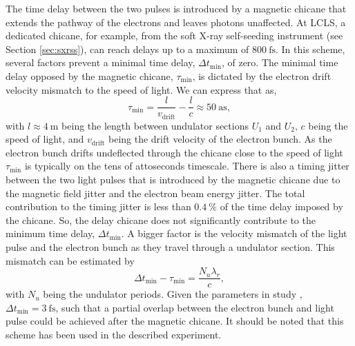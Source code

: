 %
The time delay between the two pulses is introduced by a magnetic chicane that extends the pathway of the electrons and leaves photons unaffected. At LCLS, a dedicated chicane, for example, from the soft X-ray self-seeding instrument (see Section \ref{sec:sxrss}), can reach delays up to a maximum of $\SI{800}{\femto\second}$.
In this scheme, several factors prevent a minimal time delay, $\Delta t_{\text{min}}$, of zero. The minimal time delay opposed by the magnetic chicane, $\tau_{\text{min}}$, is dictated by the electron drift velocity mismatch to the speed of light. We can express that as,
\begin{equation}
\tau_{\text{min}} = \frac{l}{v_{\text{drift}}} - \frac{l}{c}\approx \SI{50}{\atto\second},
\label{eq:alberto-delta-t-min}
\end{equation}
with $l\approx \SI{4}{\meter}$ being the length between undulator sections $U_{1}$ and $U_{2}$, $c$ being the speed of light, and $v_{\text{drift}}$ being the drift velocity of the electron bunch. As the electron bunch drifts undeflected through the chicane close to the speed of light $\tau_{\text{min}}$ is typically on the tens of attoseconds timescale.
There is also a timing jitter between the two light pulses that is introduced by the magnetic chicane due to the magnetic field jitter and the electron beam energy jitter. The total contribution to the timing jitter is less than $\SI{0.4}{\percent}$ of the time delay imposed by the chicane. So, the delay chicane does not significantly contribute to the minimum time delay, $\Delta t_{\text{min}}$. A bigger factor is the velocity mismatch of the light pulse and the electron bunch as they travel through a undulator section. This mismatch can be estimated by
\begin{equation}
\Delta t_{\text{min}}-\tau_{\text{min}}=\frac{N_{u} \lambda_{r}}{c},
\label{eq:alberto-beam-missmatch}
\end{equation}
with $N_{u}$ being the undulator periods. Given the parameters in study \citep{Lutman-2013-PRL}, $\Delta t_{\text{min}}=\SI{3}{\femto\second}$, such that a partial overlap between the electron bunch and light pulse could be achieved after the magnetic chicane. It should be noted that this scheme has been used in the described experiment.
%
